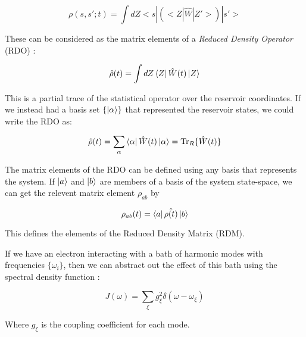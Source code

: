 \begin{equation}
\rho(s, s' ; t) = \int dZ <s|(<Z|\hat{W}|Z'>)|s'>
\end{equation}

These can be considered as the matrix elements of a \emph{Reduced Density Operator} (RDO) :

\begin{equation}
    \hat{\rho}(t) = \int dZ \bra{Z}\hat{W}(t)\ket{Z} 
\end{equation}

This is a partial trace of the statistical operator over the reservoir coordinates. If we instead had a basis set $\{\ket{\alpha}\}$ that represented the reservoir states, we could write the RDO as:

\begin{equation}
    \hat{\rho}(t) = \sum_{\alpha} \bra{\alpha}\hat{W}(t)\ket{\alpha} = \Tr_{R}\{\hat{W}(t)\}
\end{equation}

The matrix elements of the RDO can be defined using any basis that represents the system. If $\ket{a}$ and $\ket{b}$ are members of a basis of the system state-space, we can get the relevent matrix element $\rho_{ab}$ by

\begin{equation}
    \rho_{ab}(t) = \bra{a}\hat{\rho(t)}\ket{b}
\end{equation}

This defines the elements of the Reduced Density Matrix (RDM).

If we have an electron interacting with a bath of harmonic modes with frequencies $\{\omega_i\}$, then we can abstract out the effect of this bath using the spectral density function \cite{maykuhn}:

\begin{equation}
    J(\omega) = \sum_{\xi} g_{\xi}^2 \delta(\omega - \omega_{\xi})
\end{equation}

Where $g_{\xi}$ is the coupling coefficient for each mode. 




